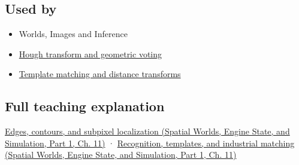 \subsection{Used by}\label{appendix-36022286b03e-used-by}

\hypertarget{appendix-36022286b03e-used-by}{}

\begin{itemize}
\tightlist
\item
  {Worlds, Images and Inference}
\item
  \hyperref[appendix-a5b0383b3b3e]{Hough transform and geometric voting}
\item
  \hyperref[appendix-5fb4af80d1c7]{Template matching and distance transforms}
\end{itemize}

\subsection{Full teaching explanation}\label{appendix-36022286b03e-full-teaching-explanation}

\hypertarget{appendix-36022286b03e-full-teaching-explanation}{}

\href{../05-Spatial-Worlds-Engine-State-and-Simulation-P01/main.pdf\#nameddest=04-visual-computing-ii-ch030-edges-contours-and-subpixel-localization}{Edges, contours, and subpixel localization (Spatial Worlds, Engine State, and Simulation, Part 1, Ch. 11)} · \href{../05-Spatial-Worlds-Engine-State-and-Simulation-P01/main.pdf\#nameddest=04-visual-computing-ii-ch030-recognition-templates-and-industrial-matching}{Recognition, templates, and industrial matching (Spatial Worlds, Engine State, and Simulation, Part 1, Ch. 11)}
